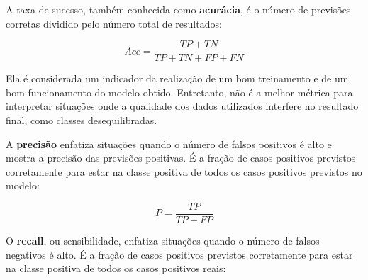 \documentclass[Portugues,Final]{ic-tese-v3}
\begin{document}
\begin{table}[h]
\label{tbl:ConfusionMatrix}
\begin{center}
  \caption{Matriz de confusão}
\end{center}
\end{table}

A taxa de sucesso, também conhecida como \textbf{acurácia}, é o número de previsões corretas dividido pelo número total de resultados:

\begin{equation}
Acc = \frac{TP + TN}{TP + TN + FP + FN}
\end{equation}

Ela é considerada um indicador da realização de um bom treinamento e de um bom funcionamento do modelo obtido. Entretanto, não é a melhor métrica para interpretar situações onde a qualidade dos dados utilizados interfere no resultado final, como classes desequilibradas.

A \textbf{precisão} enfatiza situações quando o número de falsos positivos é alto e mostra a precisão das previsões positivas. É a fração de casos positivos previstos corretamente para estar na classe positiva de todos os casos positivos previstos no modelo:

\begin{equation}
P = \frac{TP}{TP + FP}
\end{equation}

O \textbf{recall}, ou sensibilidade, enfatiza situações quando o número de falsos negativos é alto.  É a fração de casos positivos previstos corretamente para estar na classe positiva de todos os casos positivos reais:
\end{document}
